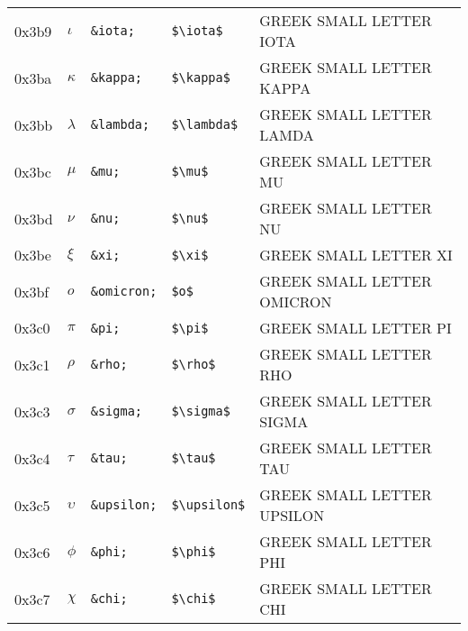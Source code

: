 \documentclass[a4paper,10pt]{article}
\begin{document}
{\begin{center}
\begin{xtabular}{llllp{10cm}}
0x3b9  & $\iota$                & \texttt{\&iota;}    & \texttt{\${\textbackslash}iota\$}                      & GREEK SMALL LETTER IOTA                    \\
0x3ba  & $\kappa$               & \texttt{\&kappa;}   & \texttt{\${\textbackslash}kappa\$}                     & GREEK SMALL LETTER KAPPA                   \\
0x3bb  & $\lambda$              & \texttt{\&lambda;}  & \texttt{\${\textbackslash}lambda\$}                    & GREEK SMALL LETTER LAMDA                   \\
0x3bc  & $\mu$                  & \texttt{\&mu;}      & \texttt{\${\textbackslash}mu\$}                        & GREEK SMALL LETTER MU                      \\
0x3bd  & $\nu$                  & \texttt{\&nu;}      & \texttt{\${\textbackslash}nu\$}                        & GREEK SMALL LETTER NU                      \\
0x3be  & $\xi$                  & \texttt{\&xi;}      & \texttt{\${\textbackslash}xi\$}                        & GREEK SMALL LETTER XI                      \\
0x3bf  & $o$                    & \texttt{\&omicron;} & \texttt{\$o\$}                                         & GREEK SMALL LETTER OMICRON                 \\
0x3c0  & $\pi$                  & \texttt{\&pi;}      & \texttt{\${\textbackslash}pi\$}                        & GREEK SMALL LETTER PI                      \\
0x3c1  & $\rho$                 & \texttt{\&rho;}     & \texttt{\${\textbackslash}rho\$}                       & GREEK SMALL LETTER RHO                     \\
0x3c3  & $\sigma$               & \texttt{\&sigma;}   & \texttt{\${\textbackslash}sigma\$}                     & GREEK SMALL LETTER SIGMA                   \\
0x3c4  & $\tau$                 & \texttt{\&tau;}     & \texttt{\${\textbackslash}tau\$}                       & GREEK SMALL LETTER TAU                     \\
0x3c5  & $\upsilon$             & \texttt{\&upsilon;} & \texttt{\${\textbackslash}upsilon\$}                   & GREEK SMALL LETTER UPSILON                 \\
0x3c6  & $\phi$                 & \texttt{\&phi;}     & \texttt{\${\textbackslash}phi\$}                       & GREEK SMALL LETTER PHI                     \\
0x3c7  & $\chi$                 & \texttt{\&chi;}     & \texttt{\${\textbackslash}chi\$}                       & GREEK SMALL LETTER CHI                     \\

\end{xtabular}
\end{center}}
\end{document}
